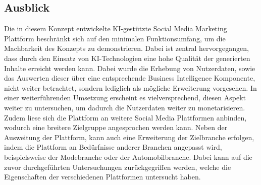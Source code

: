 \subsection{Ausblick}
Die in diesem Konzept entwickelte KI-gestützte Social Media Marketing Plattform beschränkt sich auf den minimalen Funktionsumfang, um die Machbarkeit des Konzepts zu demonstrieren.
Dabei ist zentral hervorgegangen, dass durch den Einsatz von KI-Technologien eine hohe Qualität der generierten Inhalte erreicht werden kann.
Dabei wurde die Erhebung von Nutzerdaten, sowie das Auswerten dieser über eine entsprechende Business Intelligence Komponente, nicht weiter betrachtet, sondern lediglich als mögliche Erweiterung vorgesehen.
In einer weiterführenden Umsetzung erscheint es vielversprechend, diesen Aspekt weiter zu untersuchen, um dadurch die Nutzerdaten weiter zu monetarisieren.
Zudem liese sich die Plattform an weitere Social Media Plattformen anbinden, wodurch eine breitere Zielgruppe angesprochen werden kann.
Neben der Ausweitung der Plattform, kann auch eine Erweiterung der Zielbranche erfolgen, indem die Plattform an Bedürfnisse anderer Branchen angepasst wird, beispielsweise der Modebranche oder der Automobilbranche.
Dabei kann auf die zuvor durchgeführten Untersuchungen zurückgegriffen werden, welche die Eigenschaften der verschiedenen Plattformen untersucht haben.